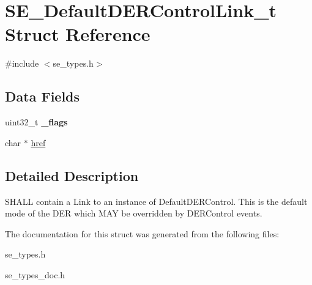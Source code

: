 \hypertarget{structSE__DefaultDERControlLink__t}{}\section{S\+E\+\_\+\+Default\+D\+E\+R\+Control\+Link\+\_\+t Struct Reference}
\label{structSE__DefaultDERControlLink__t}


{\ttfamily \#include $<$se\+\_\+types.\+h$>$}

\subsection*{Data Fields}
\begin{DoxyCompactItemize}
\item 
uint32\+\_\+t {\bfseries \+\_\+flags}
\item 
char $\ast$ \hyperlink{group__DefaultDERControlLink_ga57a5c89d55f6ff1c04b198b50a6257ad}{href}
\end{DoxyCompactItemize}


\subsection{Detailed Description}
S\+H\+A\+LL contain a Link to an instance of Default\+D\+E\+R\+Control. This is the default mode of the D\+ER which M\+AY be overridden by D\+E\+R\+Control events. 

The documentation for this struct was generated from the following files\+:\begin{DoxyCompactItemize}
\item 
se\+\_\+types.\+h\item 
se\+\_\+types\+\_\+doc.\+h\end{DoxyCompactItemize}
